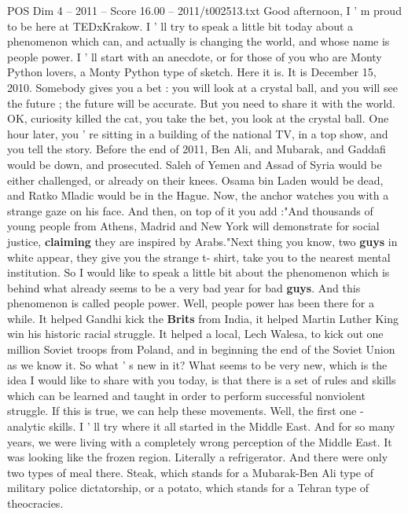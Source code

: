 \begin{textsample}{POS Dim 4 – 2011 – Score 16.00 – 2011/t002513.txt}  \label{ex:f4_pos_075}
Good afternoon, I ' m proud to be here at TEDxKrakow.
I ' ll try to speak a little bit today about a phenomenon which can, and actually is changing the world, and whose name is people power.
I ' ll start with an anecdote, or for those of you who are Monty Python lovers, a Monty Python type of sketch.
Here it is.
It is December 15, 2010.
Somebody gives you a bet : you will look at a crystal ball, and you will see the future ; the future will be accurate.
But you need to share it with the world.
OK, curiosity killed the cat, you take the bet, you look at the crystal ball.
One hour later, you ' re sitting in a building of the national TV, in a top show, and you tell the story.
Before the end of 2011, Ben Ali, and Mubarak, and Gaddafi would be down, and prosecuted.
Saleh of Yemen and Assad of Syria would be either challenged, or already on their knees.
Osama bin Laden would be dead, and Ratko Mladic would be in the Hague.
Now, the anchor watches you with a strange gaze on his face.
And then, on top of it you add :"And thousands of young people from Athens, Madrid and New York will demonstrate for social justice, \textbf{claiming} they are inspired by Arabs."Next thing you know, two \textbf{guys} in white appear, they give you the strange t- shirt, take you to the nearest mental institution.
So I would like to speak a little bit about the phenomenon which is behind what already seems to be a very bad year for bad \textbf{guys}.
And this phenomenon is called people power.
Well, people power has been there for a while.
It helped Gandhi kick the \textbf{Brits} from India, it helped Martin Luther King win his historic racial struggle.
It helped a local, Lech Walesa, to kick out one million Soviet troops from Poland, and in beginning the end of the Soviet Union as we know it.
So what ' s new in it?
What seems to be very new, which is the idea I would like to share with you today, is that there is a set of rules and skills which can be learned and taught in order to perform successful nonviolent struggle.
If this is true, we can help these movements.
Well, the first one - analytic skills.
I ' ll try where it all started in the Middle East.
And for so many years, we were living with a completely wrong perception of the Middle East.
It was looking like the frozen region.
Literally a refrigerator.
And there were only two types of meal there.
Steak, which stands for a Mubarak-Ben Ali type of military police dictatorship, or a potato, which stands for a Tehran type of theocracies.

\end{textsample}
